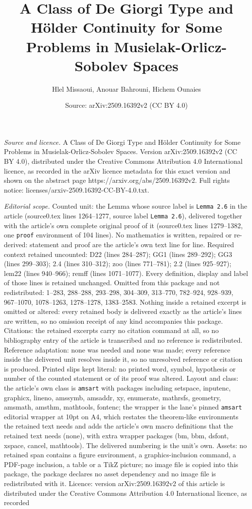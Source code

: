 \documentclass[10pt,a4paper]{amsart}
\title[A Class of De Giorgi Type and H\"older Continuity for Some P]{A Class of De Giorgi Type and H\"older Continuity for Some Problems in Musielak-Orlicz-Sobolev Spaces}
\author{Hlel Missaoui, Anouar Bahrouni, Hichem Ounaies}
\date{Source: arXiv:2509.16392v2 (CC BY 4.0)}
\begin{document}
\maketitle

\noindent\emph{Source and licence.} A Class of De Giorgi Type and H\"older Continuity for Some Problems in Musielak-Orlicz-Sobolev Spaces. Version arXiv:2509.16392v2 (CC BY 4.0), distributed under the Creative Commons Attribution 4.0 International licence, as recorded in the arXiv licence metadata for this exact version and shown on the abstract page https://arxiv.org/abs/2509.16392v2. Full rights notice: licenses/arxiv-2509.16392-CC-BY-4.0.txt.\par\smallskip

\noindent\textit{Editorial scope.} Counted unit: the Lemma whose source label is \texttt{Lemma 2.6} in the article (source0.tex lines 1264--1277, source label \texttt{Lemma 2.6}), delivered together with the article's own complete original proof of it (source0.tex lines 1279--1382, one \texttt{proof} environment of 104 lines). No mathematics is written, repaired or re-derived: statement and proof are the article's own text line for line. Required context retained uncounted: D22 (lines 284--287); GG1 (lines 289--292); GG3 (lines 299--303); 2.4 (lines 310--312); zoo (lines 771--781); 2.2 (lines 925--927); lem22 (lines 940--966); remff (lines 1071--1077). Every definition, display and label of those lines is retained unchanged. Omitted from this package and not redistributed: 1--283, 288--288, 293--298, 304--309, 313--770, 782--924, 928--939, 967--1070, 1078--1263, 1278--1278, 1383--2583. Nothing inside a retained excerpt is omitted or altered: every retained body is delivered exactly as the article's lines are written, so no omission receipt of any kind accompanies this package. Citations: the retained excerpts carry no citation command at all, so no bibliography entry of the article is transcribed and no reference is redistributed. Reference adaptation: none was needed and none was made; every reference inside the delivered unit resolves inside it, so no unresolved reference or citation is produced. Printed slips kept literal: no printed word, symbol, hypothesis or number of the counted statement or of its proof was altered. Layout and class: the article's own class is \texttt{amsart} with packages including setspace, inputenc, graphicx, lineno, amssymb, amsaddr, xy, enumerate, mathrsfs, geometry, amsmath, amsthm, mathtools, fontenc; the wrapper is the lane's pinned \texttt{amsart} editorial wrapper at 10pt on A4, which restates the theorem-like environments the retained text needs and adds the article's own macro definitions that the retained text needs (none), with extra wrapper packages (bm, bbm, dsfont, xspace, cancel, mathtools). The delivered numbering is the unit's own. Assets: no retained span contains a figure environment, a graphics-inclusion command, a PDF-page inclusion, a table or a TikZ picture; no image file is copied into this package, the package declares no asset dependency and no image file is redistributed with it. Licence: version arXiv:2509.16392v2 of this article is distributed under the Creative Commons Attribution 4.0 International licence, as recorded 
\end{document}
